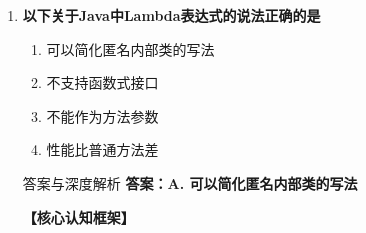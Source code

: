 \documentclass[12pt, a4paper]{ctexart}
\begin{document}
\begin{enumerate}[label=\textbf{\arabic*.}]
\begin{bluebox}{答案与深度解析}
\begin{itemize}[label={}, leftmargin=*, nosep]
\begin{itemize}[label={}, nosep]
			      \item Collection接口定义的方法
			      \item 所有集合都支持
		      

					  \end{itemize}
		      \item \textbf{B. isBlank() — 错误}
					  \begin{itemize}[label={}, nosep]
		      
			      \item String类的方法（判断空白字符串）
		      

					  \end{itemize}
		      \item \textbf{C. isNullOrEmpty() — 错误}
					  \begin{itemize}[label={}, nosep]
		      
			      \item 不是集合的标准方法
		      

					  \end{itemize}
		      \item \textbf{D. isNotNull() — 错误}
					  \begin{itemize}[label={}, nosep]
		      
			      \item 不是集合的方法
		      
		      
	      
	      
					  \end{itemize}
					  \end{itemize}
\end{bluebox}

	      \vspace{1em}

	\item \textbf{以下关于Java中Lambda表达式的说法正确的是}
	      \begin{enumerate}[label=\Alph*.]
		      \item 可以简化匿名内部类的写法
		      \item 不支持函数式接口
		      \item 不能作为方法参数
		      \item 性能比普通方法差
	      \end{enumerate}

	      \begin{bluebox}{答案与深度解析}
		      \textbf{答案：A. 可以简化匿名内部类的写法}

		      \textbf{【核心认知框架】}


\end{bluebox}
\end{enumerate}
\end{document}
